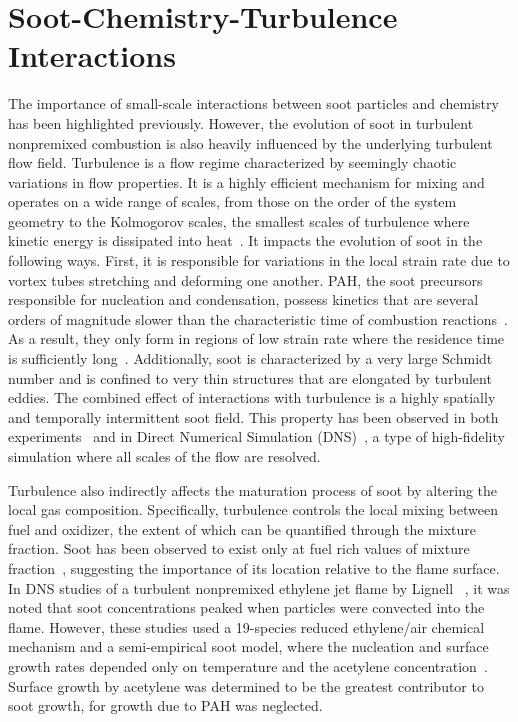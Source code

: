 \section{Soot-Chemistry-Turbulence Interactions}
\label{sec:intro:scti}

The importance of small-scale interactions between soot particles and chemistry has been highlighted previously. However, the evolution of soot in turbulent nonpremixed combustion is also heavily influenced by the underlying turbulent flow field. Turbulence is a flow regime characterized by seemingly chaotic variations in flow properties. It is a highly efficient mechanism for mixing and operates on a wide range of scales, from those on the order of the system geometry to the Kolmogorov scales, the smallest scales of turbulence where kinetic energy is dissipated into heat~\cite{pope2000}. It impacts the evolution of soot in the following ways. First, it is responsible for variations in the local strain rate due to vortex tubes stretching and deforming one another. PAH, the soot precursors responsible for nucleation and condensation, possess kinetics that are several orders of magnitude slower than the characteristic time of combustion reactions~\cite{cuoci2009}. As a result, they only form in regions of low strain rate where the residence time is sufficiently long~\cite{bisetti2012,attili2014,attili2015}. Additionally, soot is characterized by a very large Schmidt number and is confined to very thin structures that are elongated by turbulent eddies. The combined effect of interactions with turbulence is a highly spatially and temporally intermittent soot field. This property has been observed in both experiments~\cite{lee2009,qamar2009,narayanaswamy2013,mahmoud2015} and in Direct Numerical Simulation (DNS)~\cite{lignell2007,lignell2008,bisetti2012,attili2014,attili2015}, a type of high-fidelity simulation where all scales of the flow are resolved.

Turbulence also indirectly affects the maturation process of soot by altering the local gas composition. Specifically, turbulence controls the local mixing between fuel and oxidizer, the extent of which can be quantified through the mixture fraction. Soot has been observed to exist only at fuel rich values of mixture fraction~\cite{bisetti2012,attili2014,mahmoud2015,park2017}, suggesting the importance of its location relative to the flame surface. In DNS studies of a turbulent nonpremixed ethylene jet flame by Lignell \etal~\cite{lignell2007,lignell2008}, it was noted that soot concentrations peaked when particles were convected into the flame. However, these studies used a 19-species reduced ethylene/air chemical mechanism and a semi-empirical soot model, where the nucleation and surface growth rates depended only on temperature and the acetylene concentration~\cite{leung1991}. Surface growth by acetylene was determined to be the greatest contributor to soot growth, for growth due to PAH was neglected.

